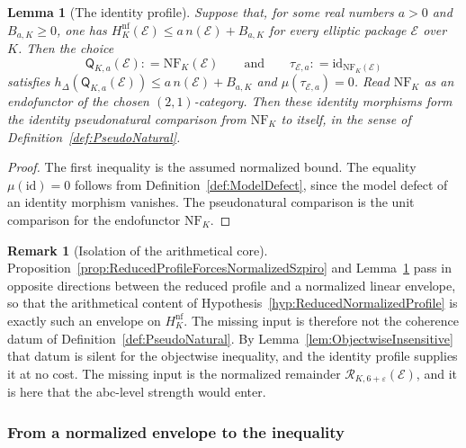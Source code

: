 \documentclass[10pt, reqno]{amsart}
\theoremstyle{plain}
\newtheorem{lemma}[theorem]{Lemma}
\theoremstyle{definition}
\newtheorem{remark}[theorem]{Remark}
\theoremstyle{plain}
\newcommand{\coloneqq}{\mathrel{\mathop:}=}
\begin{document}
\begin{lemma}[The identity profile]
\label{lem:IdentityProfileReduction}
Suppose that, for some real numbers $a>0$ and $B_{a,K}\ge 0$, one has $H^{\mathrm{nf}}_{K}(\mathcal{E})\le a\,n(\mathcal{E})+B_{a,K}$ for every elliptic package $\mathcal{E}$ over $K$. Then the choice
\[
  \mathsf{Q}_{K,a}(\mathcal{E})\coloneqq \mathrm{NF}_{K}(\mathcal{E})
  \qquad\text{and}\qquad
  \tau_{\mathcal{E},a}\coloneqq \mathrm{id}_{\mathrm{NF}_{K}(\mathcal{E})}
\]
satisfies $h_{\Delta}(\mathsf{Q}_{K,a}(\mathcal{E}))\le a\,n(\mathcal{E})+B_{a,K}$ and $\mu(\tau_{\mathcal{E},a})=0$. Read $\mathrm{NF}_{K}$ as an endofunctor of the chosen $(2,1)$-category. Then these identity morphisms form the identity pseudonatural comparison from $\mathrm{NF}_{K}$ to itself, in the sense of Definition~\ref{def:PseudoNatural}.
\end{lemma}

\begin{proof}
The first inequality is the assumed normalized bound. The equality $\mu(\mathrm{id})=0$ follows from Definition~\ref{def:ModelDefect}, since the model defect of an identity morphism vanishes. The pseudonatural comparison is the unit comparison for the endofunctor $\mathrm{NF}_{K}$.
\end{proof}

\begin{remark}[Isolation of the arithmetical core]
\label{rem:ReducedProfileArithmeticCore}
Proposition~\ref{prop:ReducedProfileForcesNormalizedSzpiro} and Lemma~\ref{lem:IdentityProfileReduction} pass in opposite directions between the reduced profile and a normalized linear envelope, so that the arithmetical content of Hypothesis~\ref{hyp:ReducedNormalizedProfile} is exactly such an envelope on $H^{\mathrm{nf}}_{K}$. The missing input is therefore not the coherence datum of Definition~\ref{def:PseudoNatural}. By Lemma~\ref{lem:ObjectwiseInsensitive} that datum is silent for the objectwise inequality, and the identity profile supplies it at no cost. The missing input is the normalized remainder $\mathcal{R}_{K,6+\varepsilon}(\mathcal{E})$, and it is here that the abc-level strength would enter.
\end{remark}

\subsubsection{From a normalized envelope to the inequality}\label{subsubsec:EnvelopeToInequality}
\end{document}
